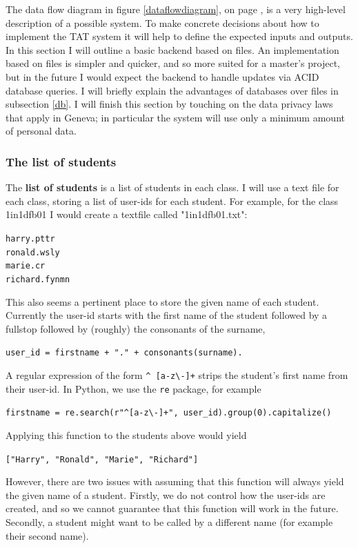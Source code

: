 \documentclass[10pt]{article}
\begin{document}
The data flow diagram in figure \ref{dataflowdiagram}, on page \pageref{dataflowdiagram}, is a very high-level description of a possible system. To make concrete decisions about how to implement the TAT system it will help to define the expected inputs and outputs. In this section I will outline a basic backend based on files.  An implementation based on files is simpler and quicker, and so more suited for a master's project, but in the future I would expect the backend to handle updates via ACID database queries. I will briefly explain the advantages of databases over files in subsection \ref{db}. I will finish this section by touching on the data privacy laws that apply in Geneva; in particular the system will use only a minimum amount of personal data.

\subsubsection{The list of students}
The \textbf{list of students} is a list of students in each class. I will use a text file for each class, storing a list of user-ids for each student. For example, for the class 1in1dfb01 I would create a textfile called "1in1dfb01.txt":
\begin{tcolorbox}[title = 1in1dfb01.txt]
\texttt{harry.pttr\\ronald.wsly\\marie.cr\\richard.fynmn}
\end{tcolorbox}
This also seems a pertinent place to store the given name of each student. Currently the user-id starts with the first name of the student followed by a fullstop followed by (roughly) the consonants of the surname, 
\begin{center}
\texttt{user\_id = firstname + "." + consonants(surname).}
\end{center}
A regular expression of the form \texttt{\textasciicircum
[a-z\textbackslash-]+} strips the student's first name from their user-id. In Python, we use the \texttt{re} package, for example
\begin{center}
\texttt{firstname = re.search(r"\textasciicircum[a-z\textbackslash-]+", user\_id).group(0).capitalize()}
\end{center}
Applying this function to the students above would yield
\begin{center}
\texttt{["Harry", "Ronald", "Marie", "Richard"]}
\end{center}

However, there are two issues with assuming that this function will always yield the given name of a student. Firstly, we do not control how the user-ids are created, and so we cannot guarantee that this function will work in the future. Secondly, a student might want to be called by a different name (for example their second name). 
\end{document}
